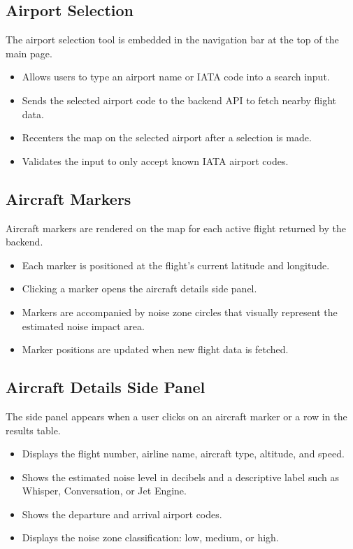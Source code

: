 \documentclass[12pt]{article}
\begin{document}
\subsection{Airport Selection}
The airport selection tool is embedded in the navigation bar at the top of the main page.

\begin{itemize}
\item Allows users to type an airport name or IATA code into a search input.
\item Sends the selected airport code to the backend API to fetch nearby flight data.
\item Recenters the map on the selected airport after a selection is made.
\item Validates the input to only accept known IATA airport codes.
\end{itemize}

\subsection{Aircraft Markers}
Aircraft markers are rendered on the map for each active flight returned by the backend.

\begin{itemize}
\item Each marker is positioned at the flight's current latitude and longitude.
\item Clicking a marker opens the aircraft details side panel.
\item Markers are accompanied by noise zone circles that visually represent the estimated noise impact area.
\item Marker positions are updated when new flight data is fetched.
\end{itemize}

\subsection{Aircraft Details Side Panel}
The side panel appears when a user clicks on an aircraft marker or a row in the results table.

\begin{itemize}
\item Displays the flight number, airline name, aircraft type, altitude, and speed.
\item Shows the estimated noise level in decibels and a descriptive label such as Whisper, Conversation, or Jet Engine.
\item Shows the departure and arrival airport codes.
\item Displays the noise zone classification: low, medium, or high.
\end{itemize}
\end{document}
